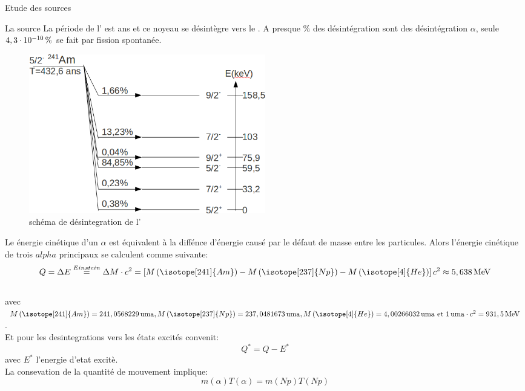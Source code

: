 \documentclass[a4paper,11pt]{scrartcl}
\begin{document}
 \begin{section}{Etude des sources}
  \begin{subsection}{La source }
   La période de l' est \unit[432,6]{ans} et ce noyeau se désintègre vers le . A presque \unit[100]{\%} des désintégration sont des désintégration $\alpha$, seule $\unit[4,3\cdot10^{-10}]{\%}$ 
   se fait par fission spontanée.  
    \begin{figure}[hbt]
     \begin{center}
      \includegraphics[width=0.5\textwidth]{Bilder/schemaAm1.png}
     \end{center}
     \caption{schéma de désintegration de l'}
    \end{figure}
   Le énergie cinétique d'un $\alpha$ est équivalent à la diffénce d'énergie causé par le défaut de masse entre les particules. Alors l'énergie cinétique de trois $alpha$ principaux se calculent comme suivante:
   \begin{equation*}
    Q=\Delta E\stackrel{Einstein}{=}\Delta M\cdot c^2=\left[M\left(\isotope[241]{Am}\right)-M\left(\isotope[237]{Np}\right)-M\left(\isotope[4]{He}\right)\right]c^2\approx\unit[5,638]{MeV}
   \end{equation*}\\
   avec $M\left(\isotope[241]{Am}\right)=\unit[241,0568229]{uma},M\left(\isotope[237]{Np}\right)=\unit[237,0481673]{uma}, \\ M\left(\isotope[4]{He}\right)=\unit[4,00266032]{uma}\text{ et }\unit[1]{uma}\cdot c^2=\unit[931,5]{MeV}$.\\
Et pour les desintegrations vers les états excités convenit:
\begin{equation*}
Q^{\ast}=Q-E^{\ast}
  \end{equation*}
avec $E^{\ast}$ l'energie d'etat excitè.\\
La consevation de la quantité de mouvement implique:
\begin{equation*}
m(\alpha)T(\alpha)=m(Np)T(Np)
  \end{equation*}

\end{subsection}
\end{section}
\end{document}
